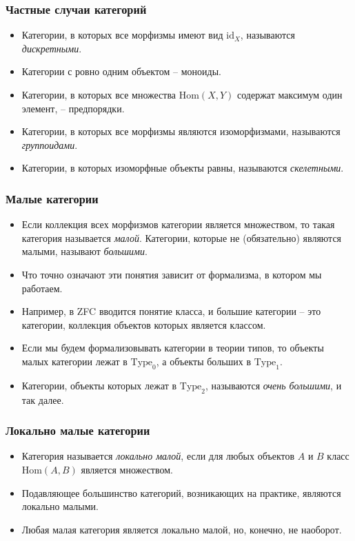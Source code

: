 \documentclass{beamer}
\newcommand{\fs}[1]{\mathrm{#1}}
\newcommand{\Hom}{\fs{Hom}}
\newcommand{\id}{\fs{id}}
\begin{document}
\begin{frame}
\frametitle{Частные случаи категорий}
\begin{itemize}
\item Категории, в которых все морфизмы имеют вид $\id_X$, называются \emph{дискретными}.
\item Категории с ровно одним объектом -- моноиды.
\item Категории, в которых все множества $\Hom(X, Y)$ содержат максимум один элемент, -- предпорядки.
\item Категории, в которых все морфизмы являются изоморфизмами, называются \emph{группоидами}.
\item Категории, в которых изоморфные объекты равны, называются \emph{скелетными}.
\end{itemize}
\end{frame}

\begin{frame}
\frametitle{Малые категории}
\begin{itemize}
\item Если коллекция всех морфизмов категории является множеством, то такая категория называется \emph{малой}.
Категории, которые не (обязательно) являются малыми, называют \emph{большими}.
\item Что точно означают эти понятия зависит от формализма, в котором мы работаем.
\item Например, в ZFC вводится понятие класса, и большие категории -- это категории, коллекция объектов которых является классом.
\item Если мы будем формализовывать категории в теории типов, то объекты малых категории лежат в $\fs{Type}_0$, а объекты больших в $\fs{Type}_1$.
\item Категории, объекты которых лежат в $\fs{Type}_2$, называются \emph{очень большими}, и так далее.
\end{itemize}
\end{frame}

\begin{frame}
\frametitle{Локально малые категории}
\begin{itemize}
\item Категория называется \emph{локально малой}, если для любых объектов $A$ и $B$ класс $\Hom(A,B)$ является множеством.
\item Подавляющее большинство категорий, возникающих на практике, являются локально малыми.
\item Любая малая категория является локально малой, но, конечно, не наоборот.
\end{itemize}
\end{frame}
\end{document}

